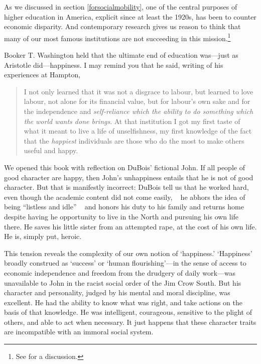 As we discussed in section \ref{forsocialmobility}, one of the central purposes of higher education in America, explicit since at least the 1920s, has been to counter economic disparity. And contemporary research gives us reason to think that many of our most famous institutions are not succeeding in this mission.\footnote{See  for a discussion.} 

Booker T. Washington held that the ultimate end of education was---just as Aristotle did---happiness. I may remind you that he said, writing of his experiences at Hampton,

\begin{quote}

I not only learned that it was not a disgrace to labour, but learned to love labour, not alone for its financial value, but for labour's own sake and for the independence and \emph{self-reliance which the ability to do something which the world wants done brings}. At that institution I got my first taste of what it meant to live a life of unselfishness, my first knowledge of the fact that the \emph{happiest} individuals are those who do the most to make others useful and happy. ~\citep[p. 43, italics mine]{Washington:1952uf}
\end{quote}

We opened this book with reflection on DuBois' fictional John. If all people of good character are happy, then John's unhappiness entails that he is not of good character. But that is manifestly incorrect: DuBois tell us that he worked hard, even though the academic content did not come easily, ~\citep[p. 144]{DuBois:1994ui} he abhors the idea of being ``listless and idle'' ~\citep[p. 146]{DuBois:1994ui} and honors his duty to his family and returns home despite having he opportunity to live in the North and pursuing his own life there. He saves his little sister from an attempted rape, at the cost of his own life. He is, simply put, heroic.

This tension reveals the complexity of our own notion of `happiness.' `Happiness' broadly construed as `success' or `human flourishing'---in the sense of access to economic independence and freedom from the drudgery of daily work---was unavailable to John in the racist social order of the Jim Crow South. But his character and personality, judged by his mental and moral discipline, was excellent. He had the ability to know what was right, and take actions on the basis of that knowledge. He was intelligent, courageous, sensitive to the plight of others, and able to act when necessary. It just happens that these character traits are incompatible with an immoral social system. 

